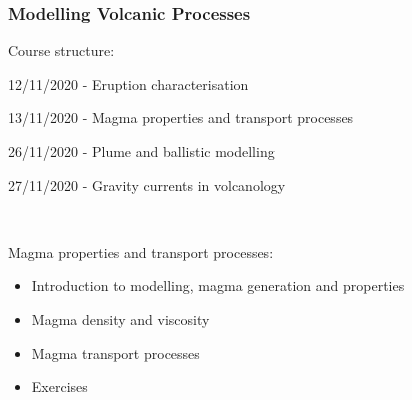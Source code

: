 \documentclass{beamer}
\begin{document}
\begin{frame}
  \frametitle{Modelling Volcanic Processes}

  Course structure:
  \begin{itemize}
  \item {\color{gray} 12/11/2020 - Eruption characterisation} \\
  \item 13/11/2020 - Magma properties and transport processes \\
  \item {\color{gray}26/11/2020 - Plume and ballistic modelling \\
  \item 27/11/2020 - Gravity currents in volcanology} \\
  \end{itemize}

  \vspace{1cm}
  
  Magma properties and transport processes:
  \begin{itemize}
  \item Introduction to modelling, magma generation and properties \\
  \item Magma density and viscosity \\
  \item Magma transport processes \\
  \item Exercises
  \end{itemize}
\end{frame}
\end{document}
